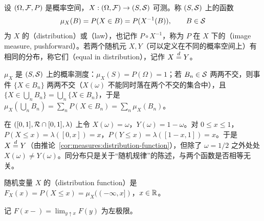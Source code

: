 
\begin{definition}[分布]\label{def:distributions:law}
设 $(\Omega,\mathcal{F},P)$ 是概率空间，$X:(\Omega,\mathcal{F})\to(S,\mathcal{S})$ 可测。称 $(S,\mathcal{S})$ 上的函数
\[
\mu_X(B)=P(X\in B)=P(X^{-1}(B)),\qquad B\in\mathcal{S}
\]
为 $X$ 的（distribution）或（law），也记作 $P\circ X^{-1}$，称为 $P$ 在 $X$ 下的（image measure, pushforward）。若两个随机元 $X,Y$（可以定义在不同的概率空间上）有相同的分布，称它们（equal in distribution），记作 $X\stackrel{d}{=} Y$。
\end{definition}

$\mu_X$ 是 $(S,\mathcal{S})$ 上的概率测度：$\mu_X(S)=P(\Omega)=1$；若 $B_n\in\mathcal{S}$ 两两不交，则事件 $\{X\in B_n\}$ 两两不交（$X(\omega)$ 不能同时落在两个不交的集合中），且 $\{X\in\bigcup_nB_n\}=\bigcup_n\{X\in B_n\}$，于是 $\mu_X(\bigcup_nB_n)=\sum_nP(X\in B_n)=\sum_n\mu_X(B_n)$。

\begin{example}[分布不决定随机变量]
在 $([0,1],\mathcal{R}\cap[0,1],\lambda)$ 上令 $X(\omega)=\omega$，$Y(\omega)=1-\omega$。对 $0\leqslant x\leqslant1$，$P(X\leqslant x)=\lambda([0,x])=x$，$P(Y\leqslant x)=\lambda([1-x,1])=x$。于是 $X\stackrel{d}{=} Y$（由推论~\ref{cor:measures:distribution-function}），但除了 $\omega=1/2$ 之外处处 $X(\omega)\neq Y(\omega)$。同分布只是关于“随机规律”的陈述，与两个函数是否相等无关。
\end{example}

\begin{definition}[分布函数]\label{def:distributions:df}
随机变量 $X$ 的（distribution function）是 $F_X(x)=P(X\leqslant x)=\mu_X((-\infty,x])$，$x\in\mathbb{R}$。
\end{definition}

记 $F(x-)=\lim_{y\uparrow x}F(y)$ 为左极限。


